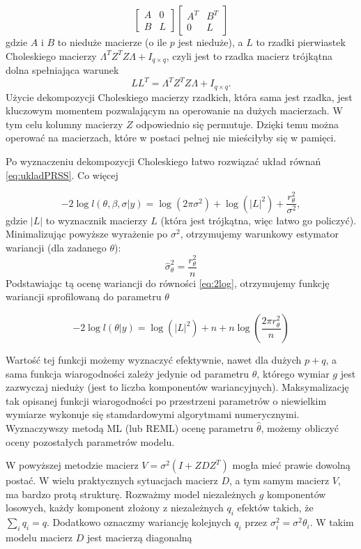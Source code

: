 \documentclass[12pt]{mwbk}
\theoremstyle{plain}
\theoremstyle{definition}
\theoremstyle{remark}
\begin{document}
$$\begin{bmatrix}
A & 0 \\
B & L
\end{bmatrix}
\begin{bmatrix}
A^T & B^T\\
0 & L
\end{bmatrix}
$$
gdzie $A$ i $B$ to nieduże macierze (o ile $p$ jest nieduże), a $L$ to rzadki pierwiastek Choleskiego macierzy $\Lambda^TZ^TZ\Lambda+I_{q\times q}$, czyli jest to rzadka macierz trójkątna dolna spełniająca warunek $$LL^T=\Lambda^TZ^TZ\Lambda +I_{q \times q}.$$ Użycie dekompozycji Choleskiego macierzy rzadkich, która sama jest rzadka, jest kluczowym momentem pozwalającym na operowanie na dużych macierzach. W tym celu kolumny macierzy $Z$ odpowiednio się permutuje. Dzięki temu można operować na macierzach, które w postaci pełnej nie mieściłyby się w pamięci.

Po wyznaczeniu dekompozycji Choleskiego łatwo rozwiązać układ równań \ref{eq:ukladPRSS}. Co więcej

\begin{equation} \label{eq:2log}
-2\log l(\theta,\beta,\sigma|y)=\log(2\pi \sigma^2)+\log(|L|^2) +\frac{r^2_{\theta}}{\sigma^2}, 
\end{equation}
gdzie $|L|$ to wyznacznik macierzy $L$ (która jest trójkątna, więc łatwo go policzyć). Minimalizując powyższe wyrażenie po $\sigma^2$, otrzymujemy warunkowy estymator wariancji (dla zadanego $\theta$):
$$\hat{\sigma}_{\theta}^2=\frac{r^2_{\theta}}{n}$$
Podstawiając tą ocenę wariancji do równości \ref{eq:2log}, otrzymujemy funkcję wariancji sprofilowaną do parametru $\theta$

$$-2 \log l(\theta|y)=\log(|L|^2)+n+n\log\left(\frac{2\pi r^2_{\theta}}{n}\right)$$

Wartość tej funkcji możemy wyznaczyć efektywnie, nawet dla dużych $p+q$, a sama funkcja wiarogodności zależy jedynie od parametru $\theta$, którego wymiar $g$ jest zazwyczaj nieduży (jest to liczba komponentów wariancyjnych). Maksymalizację tak opisanej funkcji wiarogodności po przestrzeni parametrów o niewielkim wymiarze wykonuje się stamdardowymi algorytmami numerycznymi.
Wyznaczywszy metodą ML (lub REML) ocenę parametru $\hat{\theta}$, możemy obliczyć oceny pozostałych parametrów modelu. 

W powyższej metodzie macierz $V=\sigma^2(I+ZDZ^T)$ mogła mieć prawie dowolną postać. W wielu praktycznych sytuacjach macierz $D$, a tym samym macierz $V$, ma bardzo protą strukturę.
Rozważmy model niezależnych $g$ komponentów losowych, każdy komponent złożony z niezależnych $q_i$ efektów takich, że $\sum\limits_i q_i=q$. Dodatkowo oznaczmy wariancję kolejnych $q_i$ przez $\sigma^2_i=\sigma^2\theta_i$. W takim modelu macierz $D$ jest macierzą diagonalną
\end{document}
